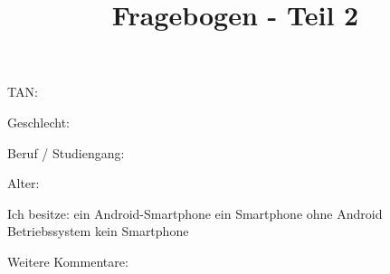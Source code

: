 \documentclass[10pt,a4paper]{scrartcl}
\title{Fragebogen - Teil 2}
\date{\vspace{-5ex}}
\begin{document}
\maketitle
\pagestyle{empty}

\vspace{2 cm}

TAN: \dotfill\\

\vspace{2 cm}

Geschlecht: \dotfill\\

\vspace{2 cm}

Beruf / Studiengang: \dotfill\\

\vspace{2 cm}

Alter: \dotfill\\

\vspace{2 cm}

Ich besitze: \textbigcircle \hspace{0.1cm} ein Android-Smartphone \textbigcircle \hspace{0.1cm} ein Smartphone ohne Android Betriebssystem \textbigcircle \hspace{0.1cm} kein Smartphone

\vspace{2 cm}

Weitere Kommentare: \dotfill\\
\end{document}
